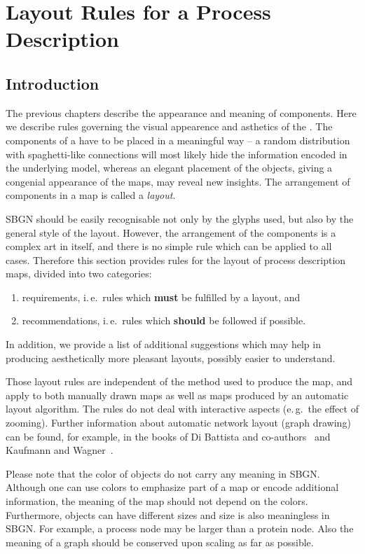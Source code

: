\chapter{Layout Rules for a Process Description}
\label{chp:layout}

\section{Introduction}

The previous chapters describe the appearance and meaning of \SBGNPDLone components. Here we describe rules governing the visual appearence and asthetics of the \PDl. The components of a \PD have to be placed in a meaningful way -- a random distribution with spaghetti-like connections will most likely hide the information encoded in the underlying model, whereas an elegant placement of the objects, giving a congenial appearance of the maps, may reveal new insights. The arrangement of components in a map is called a \emph{layout}.

SBGN \PDs should be easily recognisable not only by the
glyphs used, but also by the general style of the layout. However, the
arrangement of the components is a complex art in itself, and there is
no simple rule which can be applied to all cases. Therefore this
section provides rules for the layout of process description maps, divided
into two categories:
\begin{enumerate}
  \item requirements, i.\,e.~rules which \textbf{must} be fulfilled by a
  layout, and
  \item recommendations, i.\,e.~rules which \textbf{should} be followed if
  possible. 
\end{enumerate}
In addition, we provide a list of additional suggestions which may help in producing aesthetically more pleasant layouts, possibly easier to understand.

Those layout rules are independent of the method used to produce
the map, and apply to both manually drawn maps as well as
maps produced by an automatic layout algorithm. The rules do
not deal with interactive aspects (e.\,g.~the effect of zooming). Further information about automatic network layout
(graph drawing) can be found, for example, in the books of Di Battista and
co-authors~\cite{DiBattista:1998} and Kaufmann and Wagner~\cite{Kaufmann:2001}.

Please note that the color of objects do not carry any meaning in
SBGN. Although one can use colors to emphasize part of a map or
encode additional information, the meaning of the map should not
depend on the colors. Furthermore, objects can have different sizes
and size is also meaningless in SBGN. For example, a process node
may be larger than a protein node. Also the meaning of a graph
should be conserved upon scaling as far as possible.


